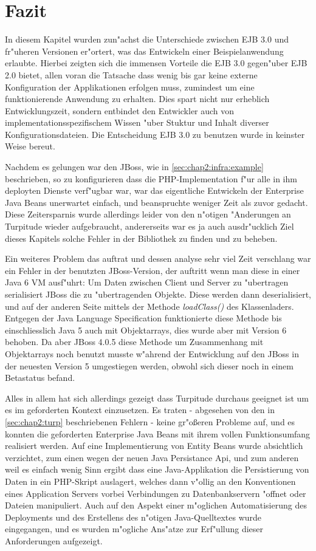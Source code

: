 \section{Fazit}
\label{sec:chap2:fazit}

In diesem Kapitel wurden zun"achst die Unterschiede zwischen EJB 3.0 und fr"uheren Versionen er"ortert, was
das Entwickeln einer Beispielanwendung erlaubte. Hierbei zeigten sich die immensen Vorteile die EJB 3.0 gegen"uber
EJB 2.0 bietet, allen voran die Tatsache dass wenig bis gar keine externe Konfiguration der Applikationen erfolgen
muss, zumindest um eine funktionierende Anwendung zu erhalten. Dies spart nicht nur erheblich Entwicklungszeit,
sondern entbindet den Entwickler auch von implementationsspezifischem Wissen "uber Stuktur und Inhalt diverser
Konfigurationsdateien. Die Entscheidung EJB 3.0 zu benutzen wurde in keinster Weise bereut.

Nachdem es gelungen war den JBoss, wie in \ref{sec:chap2:infra:example} beschrieben, so zu konfigurieren dass
die PHP-Implementation f"ur alle in ihm deployten Dienste verf"ugbar war, war das eigentliche Entwickeln der
Enterprise Java Beans unerwartet einfach, und beanspruchte weniger Zeit als zuvor gedacht. Diese Zeitersparnis
wurde allerdings leider von den n"otigen "Anderungen an Turpitude wieder aufgebraucht, andererseits war
es ja auch ausdr"ucklich Ziel dieses Kapitels solche Fehler in der Bibliothek zu finden und zu beheben.

Ein weiteres Problem das auftrat und dessen analyse sehr viel Zeit verschlang war ein Fehler in der benutzten JBoss-Version, 
der auftritt wenn man diese in einer Java 6 VM ausf"uhrt:
Um Daten zwischen Client und Server zu "ubertragen serialisiert JBoss die zu "ubertragenden Objekte. Diese
werden dann deserialisiert, und auf der anderen Seite mittels der Methode \emph{loadClass()} des Klassenladers.
Entgegen der Java Language Specification funktionierte diese Methode bis einschliesslich Java 5 auch mit Objektarrays,
dies wurde aber mit Version 6 behoben. Da aber JBoss 4.0.5 diese Methode um Zusammenhang mit Objektarrays noch benutzt
musste w"ahrend der Entwicklung auf den JBoss in der neuesten Version 5 umgestiegen werden, obwohl sich dieser noch
in einem Betastatus befand.

Alles in allem hat sich allerdings gezeigt dass Turpitude durchaus geeignet ist um es im geforderten Kontext
einzusetzen. Es traten - abgesehen von den in \ref{sec:chap2:turp} beschriebenen Fehlern - keine gr"o\ss eren Probleme
auf, und es konnten die geforderten Enterprise Java Beans mit ihrem vollen Funktionsumfang realisiert werden.
Auf eine Implementierung von Entity Beans wurde absichtlich verzichtet, zum einen wegen der neuen Java Persistance Api,
und zum anderen weil es einfach wenig Sinn ergibt dass eine Java-Applikation die Persistierung von Daten in ein
PHP-Skript auslagert, welches dann v"ollig an den Konventionen eines Application Servers vorbei Verbindungen zu Datenbankservern
"offnet oder Dateien manipuliert.
Auch auf den Aspekt einer m"oglichen Automatisierung des Deployments und des Erstellens des n"otigen Java-Quelltextes
wurde eingegangen, und es wurden m"ogliche Ans"atze zur Erf"ullung dieser Anforderungen aufgezeigt.

